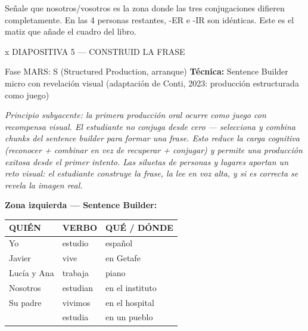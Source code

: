 \documentclass[a4paper,10pt]{article}
\renewcommand{\arraystretch}{1.3}
\begin{document}
\begin{notabox}
{\small Señale que nosotros/vosotros es la zona donde las tres conjugaciones difieren completamente. En las 4 personas restantes, -ER e -IR son idénticas. Este es el matiz que añade el cuadro del libro.}
\end{notabox}

\newpage


\begin{diapheader}{x}
DIAPOSITIVA 5 — CONSTRUID LA FRASE
\end{diapheader}

\vspace{0.3cm}

\begin{marsbox}{Fase MARS: S (Structured Production, arranque)}
\textbf{Técnica:} Sentence Builder micro con revelación visual (adaptación de Conti, 2023: producción estructurada como juego)
\end{marsbox}

\vspace{0.2cm}

{\small\textit{Principio subyacente: la primera producción oral ocurre como juego con recompensa visual. El estudiante no conjuga desde cero — selecciona y combina chunks del sentence builder para formar una frase. Esto reduce la carga cognitiva (reconocer + combinar en vez de recuperar + conjugar) y permite una producción exitosa desde el primer intento. Las siluetas de personas y lugares aportan un reto visual: el estudiante construye la frase, la lee en voz alta, y si es correcta se revela la imagen real.}}

\vspace{0.5cm}


\noindent\textcolor{azulprincipal}{\textbf{\large Zona izquierda — Sentence Builder:}}

\vspace{0.3cm}

\begin{center}
\renewcommand{\arraystretch}{1.6}
\begin{tabular}{|>{\centering\arraybackslash}p{3.5cm}|>{\centering\arraybackslash}p{3cm}|>{\centering\arraybackslash}p{4cm}|}
\hline
\rowcolor{azulprincipal!15}
\textbf{QUIÉN} & \textbf{VERBO} & \textbf{QUÉ / DÓNDE} \\
\hline
Yo & estudio & español \\
\hline
\rowcolor{gris}
Javier & vive & en Getafe \\
\hline
Lucía y Ana & trabaja & piano \\
\hline
\rowcolor{gris}
Nosotros & estudian & en el instituto \\
\hline
Su padre & vivimos & en el hospital \\
\hline
\rowcolor{gris}
& estudia & en un pueblo \\
\hline
\end{tabular}
\end{center}
\end{document}
